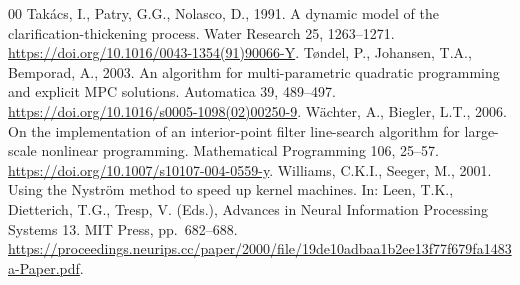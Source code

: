 \documentclass[a4paper,fleqn]{cas-sc}
\begin{document}
\begin{thebibliography}{00}
Tak\'acs, I., Patry, G.G., Nolasco, D., 1991. A dynamic model of the clarification-thickening process. Water Research 25, 1263--1271. \url{https://doi.org/10.1016/0043-1354(91)90066-Y}.
T{\o}ndel, P., Johansen, T.A., Bemporad, A., 2003. An algorithm for multi-parametric quadratic programming and explicit MPC solutions. Automatica 39, 489--497. \url{https://doi.org/10.1016/s0005-1098(02)00250-9}.
W\"achter, A., Biegler, L.T., 2006. On the implementation of an interior-point filter line-search algorithm for large-scale nonlinear programming. Mathematical Programming 106, 25--57. \url{https://doi.org/10.1007/s10107-004-0559-y}.
Williams, C.K.I., Seeger, M., 2001. Using the Nystr\"om method to speed up kernel machines. In: Leen, T.K., Dietterich, T.G., Tresp, V. (Eds.), Advances in Neural Information Processing Systems 13. MIT Press, pp.~682--688. \url{https://proceedings.neurips.cc/paper/2000/file/19de10adbaa1b2ee13f77f679fa1483a-Paper.pdf}.
\end{thebibliography}
\end{document}
